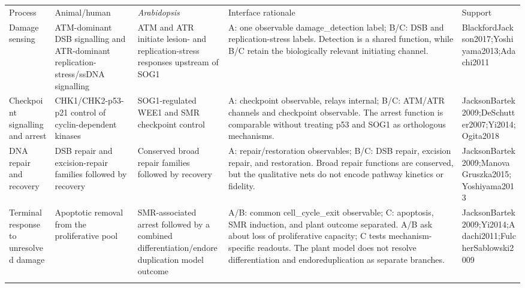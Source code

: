 \begin{tabularx}{\textwidth}{@{}p{}YYYp{0.15\textwidth}@{}}
\toprule
Process & Animal/human & \textit{Arabidopsis} & Interface rationale & Support \\
\colrule
Damage sensing & ATM-dominant DSB signalling and ATR-dominant replication-stress/ssDNA signalling & ATM and ATR initiate lesion- and replication-stress responses upstream of SOG1 & A: one observable damage\_detection label; B/C: DSB and replication-stress labels. Detection is a shared function, while B/C retain the biologically relevant initiating channel. & BlackfordJackson2017;Yoshiyama2013;Adachi2011 \\
Checkpoint signalling and arrest & CHK1/CHK2-p53-p21 control of cyclin-dependent kinases & SOG1-regulated WEE1 and SMR checkpoint control & A: checkpoint observable, relays internal; B/C: ATM/ATR channels and checkpoint observable. The arrest function is comparable without treating p53 and SOG1 as orthologous mechanisms. & JacksonBartek2009;DeSchutter2007;Yi2014;Ogita2018 \\
DNA repair and recovery & DSB repair and excision-repair families followed by recovery & Conserved broad repair families followed by recovery & A: repair/restoration observables; B/C: DSB repair, excision repair, and restoration. Broad repair functions are conserved, but the qualitative nets do not encode pathway kinetics or fidelity. & JacksonBartek2009;ManovaGruszka2015;Yoshiyama2013 \\
Terminal response to unresolved damage & Apoptotic removal from the proliferative pool & SMR-associated arrest followed by a combined differentiation/endoreduplication model outcome & A/B: common cell\_cycle\_exit observable; C: apoptosis, SMR induction, and plant outcome separated. A/B ask about loss of proliferative capacity; C tests mechanism-specific readouts. The plant model does not resolve differentiation and endoreduplication as separate branches. & JacksonBartek2009;Yi2014;Adachi2011;FulcherSablowski2009 \\
\botrule
\end{tabularx}

